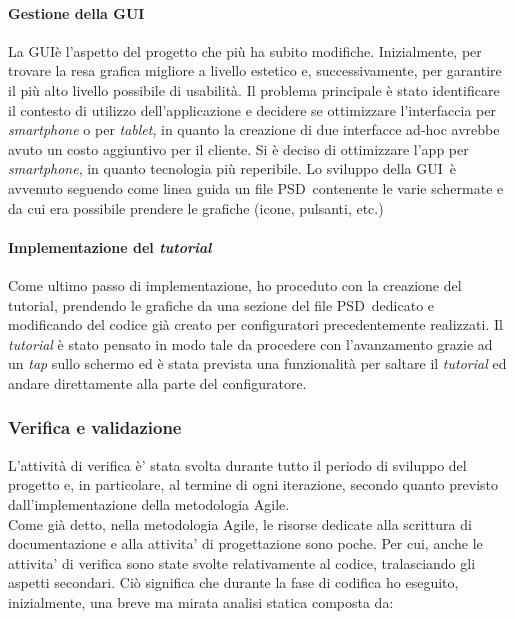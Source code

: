 \paragraph{Gestione della GUI\gloss}
La GUI\gloss \`e l'aspetto del progetto che pi\`u ha subito modifiche. Inizialmente, per trovare la resa grafica migliore a livello estetico e, successivamente, per garantire il pi\`u alto livello possibile di usabilit\`a. Il problema principale \`e stato identificare il contesto di utilizzo dell'applicazione e decidere se ottimizzare l'interfaccia per \textit{smartphone} o per \textit{tablet}, in quanto la creazione di due interfacce ad-hoc avrebbe avuto un costo aggiuntivo per il cliente. Si \`e deciso di ottimizzare l'app per \textit{smartphone}, in quanto tecnologia pi\`u reperibile. Lo sviluppo della GUI\gloss\ \`e avvenuto seguendo come linea guida un file PSD\gloss\ contenente le varie schermate e da cui era possibile prendere le grafiche (icone, pulsanti, etc.)

\paragraph{Implementazione del \textit{tutorial}}
Come ultimo passo di implementazione, ho proceduto con la creazione del tutorial, prendendo le grafiche da una sezione del file PSD\gloss\ dedicato e modificando del codice gi\`a creato per configuratori precedentemente realizzati. Il \textit{tutorial} \`e stato pensato in modo tale da procedere con l'avanzamento grazie ad un \textit{tap} sullo schermo ed \`e stata prevista una funzionalit\`a per saltare il \textit{tutorial} ed andare direttamente alla parte del configuratore.

\subsubsection{Verifica e validazione}
L'attivit\`a di verifica \`e' stata svolta durante tutto il periodo di sviluppo del progetto e, in particolare, al termine di ogni iterazione, secondo quanto previsto dall'implementazione della metodologia Agile.\\ 
Come gi\`a detto, nella metodologia Agile, le risorse dedicate alla scrittura di documentazione e alla attivita' di progettazione sono poche. Per cui, anche le attivita' di verifica sono state svolte relativamente al codice, tralasciando gli aspetti secondari.
Ci\`o significa che durante la fase di codifica ho eseguito, inizialmente, una breve ma mirata analisi statica composta da:

